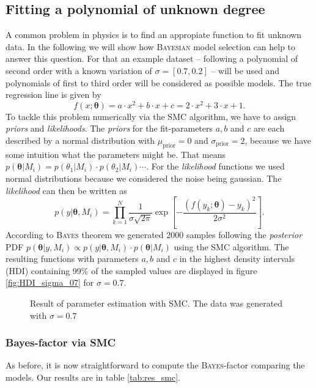 \documentclass[%
 reprint,
 amsmath,amssymb,
 aps,
]{revtex4-1}
\newcommand{\btheta}{\boldsymbol{\theta}}
\begin{document}
\subsection{Fitting a polynomial of unknown degree}
\noindent A common problem in physics is to find an appropiate function to fit unknown data. In the following we will show how \textsc{Bayesian} model selection can help to answer this question. For that an example dataset -- following a polynomial of second order with a known variation of $\sigma=[0.7, 0.2]$ -- will be used and polynomials of first to third order will be considered as possible models. 
The true regression line is given by
\begin{equation*}
	f(x;\btheta)=a\cdot x^2+b\cdot x+c=2\cdot x^2+3\cdot x+1.
\end{equation*}
To tackle this problem numerically via the SMC algorithm, we have to assign \emph{priors} and \emph{likelihoods}. The \emph{priors} for the fit-parameters $a,b$ and $c$  are each described by a normal distribution with $\mu_{\text{prior}}=0$ and $\sigma_{\text{prior}}=2$, because we have some intuition what the parameters might be. That means $p(\btheta|M_i)=p(\theta_1|M_i)\cdot p(\theta_2|M_i)\cdots $. For the \emph{likelihood} functions we used normal distributions because we considered the noise being gaussian. The \emph{likelihood} can then be written as \cite[Chap. 3]{sivia}
$$p(y|\btheta, M_i)=\prod_{k=1}^{N}\frac{1}{\sigma\sqrt{2\pi}}\exp{\left[-\frac{(f(y_k;\btheta)-y_k)^2}{2\sigma^2}\right]}.$$
According to \textsc{Bayes} theorem we generated 2000 samples following the \emph{posterior} PDF $p(\btheta|y,M_i)\propto p(y|\btheta, M_i)\cdot p(\btheta|M_i) $ using the SMC algorithm. The resulting functions with parameters $a,b$ and $c$ in the highest density intervals (HDI) containing 99\% of the sampled values are displayed in figure \eqref{fig:HDI_sigma_07} for $\sigma=0.7$.
\begin{figure*}[htbp]
	\caption{Result of parameter estimation with SMC. The data was generated with $\sigma=0.7$}\label{fig:HDI_sigma_07}
\end{figure*}


\subsubsection{\textbf{Bayes-factor via SMC}}
\noindent As before, it is now straightforward to compute the \textsc{Bayes}-factor comparing the models. Our results are in table \eqref{tab:res_smc}.
\end{document}
